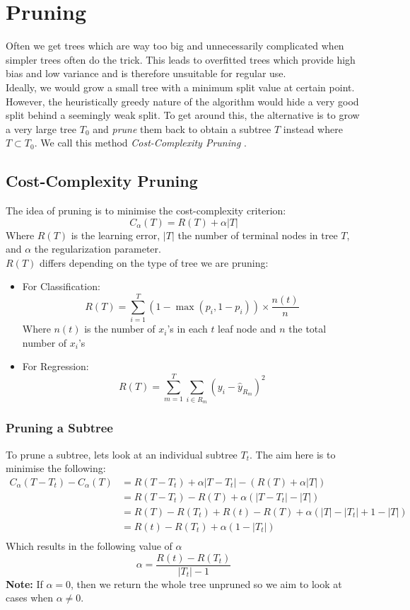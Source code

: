 \documentclass[11pt,a4paper]{report}
\begin{document}
\section{Pruning}
Often we get trees which are way too big and unnecessarily complicated when simpler trees often do the trick. 
This leads to overfitted trees which provide high bias and low variance and is therefore unsuitable for regular use.\\
Ideally, we would grow a small tree with a minimum split value at certain point.
However, the heuristically greedy nature of the algorithm would hide a very good split behind a seemingly weak split. 
To get around this, the alternative is to grow a very large tree $T_0$ and \textit{prune} them back to obtain a subtree $T$ instead where $T \subset T_0$.
We call this method \textit{Cost-Complexity Pruning} \cite{BreimanDT}.

\subsection{Cost-Complexity Pruning}
The idea of pruning is to minimise the cost-complexity criterion:
\begin{equation}
    C_{\alpha} (T) = R(T) + \alpha \left|T\right|
\end{equation}
Where $R(T)$ is the learning error, $\left|T\right|$ the number of terminal nodes in tree $T$, and $\alpha$ the regularization parameter.\\
$R(T)$ differs depending on the type of tree we are pruning:
\begin{itemize}
    \item For Classification: 
    \[ R(T) = \sum_{i = 1}^{T} (1 - \max (p_i, 1 - p_i)) \times \frac{n(t)}{n} \]
    Where $n(t)$ is the number of $x_i$'s in each $t$ leaf node and $n$ the total number of $x_i$'s
    
    \item For Regression:
    \[ R(T) = \sum_{m=1}^{T} \sum_{i \in R_m} (y_i - \hat{y}_{R_m})^2 \]
\end{itemize}

\subsubsection{Pruning a Subtree}
To prune a subtree, lets look at an individual subtree $T_t$. 
The aim here is to minimise the following:
\[ 
\begin{split}
    C_\alpha(T-T_t) - C_\alpha(T) &= R(T-T_t)+ \alpha|T-T_t| - (R(T)+ \alpha|T|)\\
    &=R(T-T_t)-R(T)+\alpha(|T-T_t|-|T|)\\
    &=R(T)-R(T_t)+R(t)-R(T) + \alpha(|T|-|T_t|+1-|T|)\\
    &=R(t)-R(T_t) + \alpha(1-|T_t|)\\
\end{split} \]
Which results in the following value of $\alpha$
\[ \alpha = \frac{R(t)-R(T_t)}{|T_t| - 1} \]
\textbf{Note:} If $\alpha = 0$, then we return the whole tree unpruned so we aim to look at cases when $\alpha \neq 0$.
\end{document}
